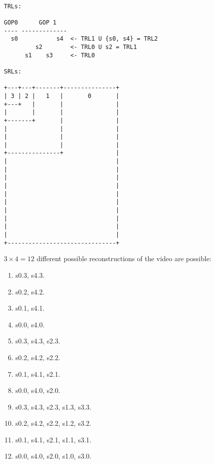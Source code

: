 \begin{verbatim}

TRLs:

GOP0      GOP 1
---- -------------
  s0           s4  <- TRL1 U {s0, s4} = TRL2
         s2        <- TRL0 U s2 = TRL1
      s1    s3     <- TRL0

SRLs:

+---+---+-------+---------------+
| 3 | 2 |   1   |       0       |
+---+   |       |               |
|       |       |               |
+-------+       |               |
|               |               |
|               |               |
|               |               |
+---------------+               |
|                               |
|                               |
|                               |
|                               |
|                               |
|                               |
|                               |
|                               |
|                               |
|                               |
+-------------------------------+
\end{verbatim}

$3\times 4=12$ different possible reconstructions of the video are possible:
\begin{enumerate}
\item s0.3, s4.3.
\item s0.2, s4.2.
\item s0.1, s4.1.
\item s0.0, s4.0.
\item s0.3, s4.3, s2.3.
\item s0.2, s4.2, s2.2.
\item s0.1, s4.1, s2.1.
\item s0.0, s4.0, s2.0.
\item s0.3, s4.3, s2.3, s1.3, s3.3.
\item s0.2, s4.2, s2.2, s1.2, s3.2.
\item s0.1, s4.1, s2.1, s1.1, s3.1.
\item s0.0, s4.0, s2.0, s1.0, s3.0.
\end{enumerate}

